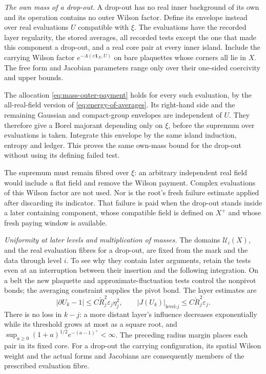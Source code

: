 \documentclass[11pt,letterpaper,reqno]{amsart}
\theoremstyle{definition}
\theoremstyle{remark}
\begin{document}
\emph{The own mass of a drop-out.}
A drop-out has no real inner background of its own and its
operation contains no outer Wilson factor. Define its envelope
instead over real evaluations \(U\) compatible with \(\xi\).
The evaluations have the recorded layer regularity, the stored
averages, all recorded tests except the one that made this
component a drop-out, and a real core pair at every inner island.
Include the carrying Wilson factor
\(e^{-A(\upsilon\mathbf1_X,U)}\) on bare plaquettes whose
corners all lie in \(X\). The free form and Jacobian parameters
range only over their one-sided coercivity and upper bounds.

The allocation \eqref{eq:mass-outer-payment} holds for every such
evaluation, by the all-real-field version of
\eqref{eq:energy-of-averages}. Its right-hand side and the
remaining Gaussian and compact-group envelopes are independent
of \(U\). They therefore give a Borel majorant depending only
on \(\xi\), before the supremum over evaluations is taken.
Integrate this envelope by the same island induction, entropy
and ledger. This proves the same own-mass bound for the
drop-out without using its defining failed test.

The supremum must remain fibred over \(\xi\): an arbitrary
independent real field would include a flat field and remove the
Wilson payment. Complex evaluations of this Wilson factor are
not used. Nor is the root's fresh failure estimate applied after
discarding its indicator. That failure is paid when the drop-out
stands inside a later containing component, whose compatible
field is defined on \(X^+\) and whose fresh paying window is
available.

\emph{Uniformity at later levels and multiplication of masses.}
The domains \(\mathcal U_i(X)\), and the real evaluation fibres
for a drop-out, are fixed from the mark and the data through
level \(i\). To see why they contain later arguments, retain the
tests even at an interruption between their insertion and the
following integration. On a belt the new plaquette and
approximate-fluctuation tests control the nonpivot bonds; the
averaging constraint supplies the pivot bond. The layer estimates
are
\[
 |\partial U_k-1|\le C\check R_j^2\varepsilon_j\eta_j^2,\qquad
 |J(U_k)|_{\text{level-}j}\le C\check R_j^2\varepsilon_j.
\]
There is no loss in \(k-j\): a more distant layer's influence
decreases exponentially while its threshold grows at most as a
square root, and
\(\sup_{a\ge0}(1+a)^{1/2}e^{-(a-1)^+}<\infty\).
The preceding radius margin places each pair in its fixed core.
For a drop-out the carrying configuration, its spatial Wilson
weight and the actual forms and Jacobians are consequently
members of the prescribed evaluation fibre.
\end{document}
